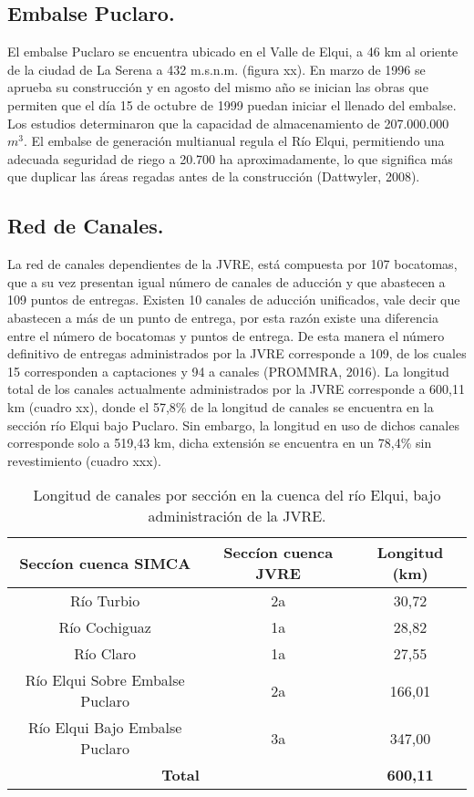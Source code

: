 \documentclass[10pt]{article}
\begin{document}
\subsection{Embalse Puclaro.}%
El embalse Puclaro se encuentra ubicado en el Valle de Elqui, a 46 km al oriente de la ciudad de La Serena a 432 m.s.n.m. (figura xx).
En marzo de 1996 se aprueba su construcción y en agosto del mismo año se inician las obras que permiten que el día 15 de octubre de 1999 puedan iniciar el llenado del embalse. Los estudios determinaron que la capacidad de almacenamiento de 207.000.000 $m^3$.
El embalse de generación multianual regula el Río Elqui, permitiendo una adecuada seguridad de riego a 20.700 ha aproximadamente, lo que significa más que duplicar las áreas regadas antes de la construcción (Dattwyler, 2008).

\subsection{Red de Canales.}
La red de canales dependientes de la JVRE, está compuesta por 107 bocatomas, que a su vez presentan igual número de canales de aducción y que abastecen a 109 puntos de entregas. Existen 10 canales de aducción unificados, vale decir que abastecen a más de un punto de entrega, por esta razón existe una diferencia entre el número de bocatomas y puntos de entrega. De esta manera el número definitivo de entregas administrados por la JVRE corresponde a 109, de los cuales 15 corresponden a captaciones y 94 a canales (PROMMRA, 2016).
La longitud total de los canales actualmente administrados por la JVRE corresponde a 600,11 km (cuadro xx), donde el 57,8\% de la longitud de canales se encuentra en la sección río Elqui bajo Puclaro. Sin embargo, la longitud en uso de dichos canales corresponde solo a  519,43 km, dicha extensión se encuentra en un 78,4\% sin revestimiento (cuadro xxx).\\

\begin{table}[]
\centering
\caption{Longitud de canales por sección en la cuenca del río Elqui, bajo administración de la JVRE.}
\label{my-label}
\begin{tabular}{|c|c|c|}
\hline
\textbf{Seccíon cuenca SIMCA}   & \textbf{Seccíon cuenca JVRE} & \textbf{Longitud (km)} \\ \hline
Río Turbio                      & 2a                           & 30,72                  \\ \hline
Río Cochiguaz                   & 1a                           & 28,82                  \\ \hline
Río Claro                       & 1a                           & 27,55                  \\ \hline
Río Elqui Sobre Embalse Puclaro & 2a                           & 166,01                 \\ \hline
Río Elqui Bajo Embalse Puclaro  & 3a                           & 347,00                 \\ \hline
\multicolumn{2}{|c|}{\textbf{Total}}                           & \textbf{600,11}        \\ \hline
\end{tabular}
\end{table}
\end{document}
